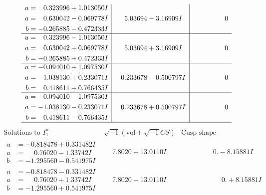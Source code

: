 \documentclass[1p]{elsarticle_modified}
\theoremstyle{definition}
\newcommand{\I}{\sqrt{-1}}
\begin{document}
$$\begin{array}{c|c|c}
\begin{aligned}
u &= \phantom{-}0.323996 + 1.013050 I \\
a &= \phantom{-}0.630042 - 0.069778 I \\
b &= -0.265885 - 0.472333 I\end{aligned}
 & \phantom{-}5.03694 - 3.16909 I & \phantom{-0.000000 } 0 \\ \hline\begin{aligned}
u &= \phantom{-}0.323996 - 1.013050 I \\
a &= \phantom{-}0.630042 + 0.069778 I \\
b &= -0.265885 + 0.472333 I\end{aligned}
 & \phantom{-}5.03694 + 3.16909 I & \phantom{-0.000000 } 0 \\ \hline\begin{aligned}
u &= -0.094010 + 1.097530 I \\
a &= -1.038130 + 0.233071 I \\
b &= \phantom{-}0.418611 + 0.766435 I\end{aligned}
 & \phantom{-}0.233678 - 0.500797 I & \phantom{-0.000000 } 0 \\ \hline\begin{aligned}
u &= -0.094010 - 1.097530 I \\
a &= -1.038130 - 0.233071 I \\
b &= \phantom{-}0.418611 - 0.766435 I\end{aligned}
 & \phantom{-}0.233678 + 0.500797 I & \phantom{-0.000000 } 0\\
 \hline 
 \end{array}$$\newpage$$\begin{array}{c|c|c}  
\text{Solutions to }I^u_{1}& \I (\text{vol} + \sqrt{-1}CS) & \text{Cusp shape}\\
 \hline 
\begin{aligned}
u &= -0.818478 + 0.331482 I \\
a &= \phantom{-}0.76020 - 1.33742 I \\
b &= -1.295560 - 0.541975 I\end{aligned}
 & \phantom{-}7.8020 + 13.0110 I & \phantom{-0.000000 } 0. - 8.15881 I \\ \hline\begin{aligned}
u &= -0.818478 - 0.331482 I \\
a &= \phantom{-}0.76020 + 1.33742 I \\
b &= -1.295560 + 0.541975 I\end{aligned}
 & \phantom{-}7.8020 - 13.0110 I & \phantom{-0.000000 -}0. + 8.15881 I \\ \hline\begin{aligned}

\end{aligned}
\end{array}$$
\end{document}
